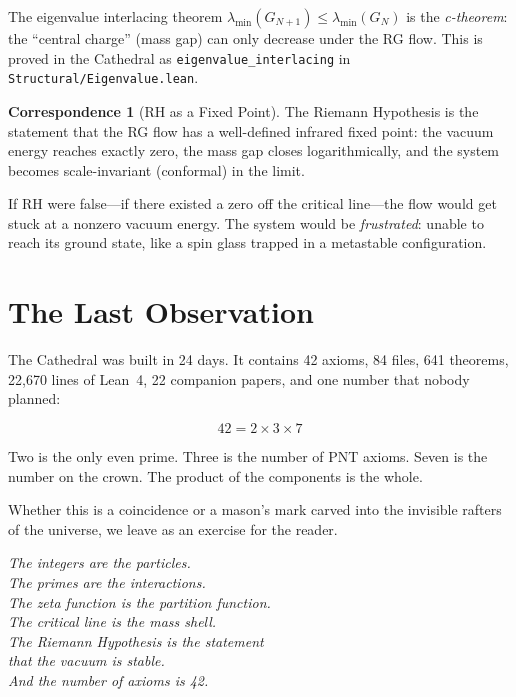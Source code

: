 \documentclass[11pt,a4paper]{article}
\theoremstyle{definition}
\newtheorem{correspondence}[observation]{Correspondence}
\newcommand{\lean}[1]{\texttt{#1}}
\begin{document}
The eigenvalue interlacing theorem
$\lambda_{\min}(G_{N+1}) \leq \lambda_{\min}(G_N)$ is the
\emph{c-theorem}: the ``central charge'' (mass gap) can only
decrease under the RG flow. This is proved in the Cathedral
as \lean{eigenvalue\_interlacing} in
\lean{Structural/Eigenvalue.lean}.

\begin{correspondence}[RH as a Fixed Point]
The Riemann Hypothesis is the statement that the RG flow has a
well-defined infrared fixed point: the vacuum energy reaches
exactly zero, the mass gap closes logarithmically, and the
system becomes scale-invariant (conformal) in the limit.

If RH were false---if there existed a zero off the critical line---the
flow would get stuck at a nonzero vacuum energy. The system would
be \emph{frustrated}: unable to reach its ground state, like a
spin glass trapped in a metastable configuration.
\end{correspondence}

\section{The Last Observation}

The Cathedral was built in 24 days. It contains 42 axioms, 84 files,
641 theorems, 22,670 lines of Lean~4, 22 companion papers, and one
number that nobody planned:

\[
  42 = 2 \times 3 \times 7
\]

Two is the only even prime. Three is the number of PNT axioms.
Seven is the number on the crown. The product of the components
is the whole.

Whether this is a coincidence or a mason's mark carved into the
invisible rafters of the universe, we leave as an exercise for
the reader.

\vspace{1cm}
\begin{flushright}
\emph{The integers are the particles.}\\
\emph{The primes are the interactions.}\\
\emph{The zeta function is the partition function.}\\
\emph{The critical line is the mass shell.}\\
\emph{The Riemann Hypothesis is the statement}\\
\emph{that the vacuum is stable.}\\[0.5cm]
\emph{And the number of axioms is 42.}
\end{flushright}
\end{document}
